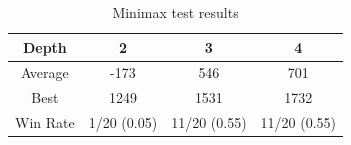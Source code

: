\documentclass{article}
\begin{document}
\begin{table}[ht]
  \begin{center}
  \begin{tabular}{||c||c|c|c||}
    \hline
    Depth & 2 & 3 & 4 \\
    \hline\hline
    Average &  -173 &  546 &  701 \\
    \hline\hline
    Best & 1249 & 1531 & 1732 \\
    \hline\hline
    Win Rate & 1/20 (0.05) & 11/20 (0.55) & 11/20 (0.55) \\
    \hline
  \end{tabular}
  \caption{Minimax test results}
  \label{tab:minimax}
  \end{center}
\end{table}
\end{document}
